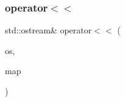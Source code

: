 \subsubsection{\texorpdfstring{operator$<$$<$}{operator<<}}
{\footnotesize\ttfamily std\+::ostream\& operator$<$$<$ (\begin{DoxyParamCaption}\item[{std\+::ostream \&}]{os,  }\item[{const \mbox{\hyperlink{classLinkedHashMap}{Linked\+Hash\+Map}}$<$ K, V $>$ \&}]{map }\end{DoxyParamCaption})\hspace{0.3cm}{\ttfamily [friend]}}

